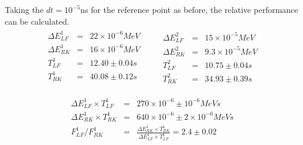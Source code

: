 \documentclass{book}
\begin{document}
Taking the $dt=10^{-5}$ns for the reference point as before, the relative performance can be calculated.
\begin{eqnarray*}
    \begin{aligned}
        \Delta E_{LF}^1 &=& 22 \times 10^{-6} MeV \\
        \Delta E_{RK}^1 &=& 16 \times 10^{-6} MeV \\
        T_{LF}^1 &=& 12.40 \pm 0.04 s \\
        T_{RK}^1 &=& 40.08 \pm 0.12 s \\
    \end{aligned}
    \qquad
    \begin{aligned}
        \Delta E_{LF}^2 &=& 15 \times 10^{-5} MeV \\
        \Delta E_{RK}^2 &=& 9.3 \times 10^{-5} MeV \\
        T_{LF}^2 &=& 10.75 \pm 0.04 s \\
        T_{RK}^2 &=& 34.93 \pm 0.39 s 
    \end{aligned}
\end{eqnarray*}

\begin{eqnarray} \label{eq:f_lf_rk_1}
    \Delta E_{LF}^1 \times T_{LF}^1 &=& 270 \times 10^{-6} \pm 10^{-6} MeV s \nonumber\\ %
    \Delta E_{RK}^1 \times T_{RK}^1 &=& 640 \times 10^{-6} \pm 2\times 10^{-6}  MeV s \nonumber\\ %
    F_{LF}^1/F_{RK}^1 &=& \frac{\Delta E_{RK}^1 \times T_{RK}^1 }{\Delta E_{LF}^1 \times T_{LF}^1} = 2.4 \pm 0.02
\end{eqnarray}
\end{document}
